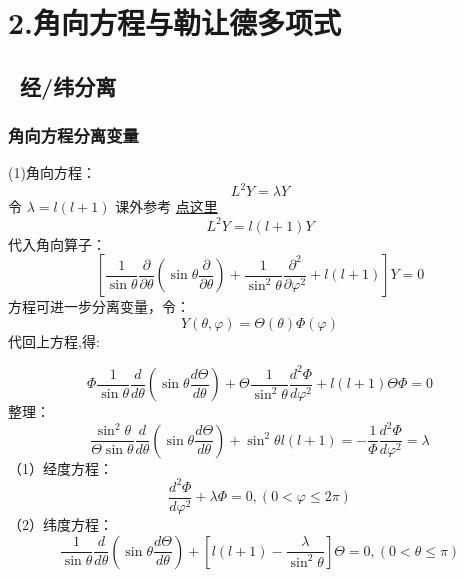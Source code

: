 \section{2.角向方程与勒让德多项式}

\subsection{ 经/纬分离}

\begin{frame}
	\frametitle{角向方程分离变量}
	(1)角向方程：
	\begin{equation*}
		L^2 Y=\lambda Y
	\end{equation*}	
	令 $\lambda=l(l+1) $ 课外参考 \href{https://zhuanlan.zhihu.com/p/133865994}{点这里}
	\begin{equation*}
		L^2 Y=l(l+1) Y
	\end{equation*}	
	代入角向算子：
	\begin{equation*}
		\left[ \frac{1}{ \sin \theta  } \frac{\partial }{\partial \theta } (\sin \theta \frac{\partial }{\partial \theta } )
		+\frac{1}{ \sin^2 \theta  } \frac{\partial^2}{\partial\varphi ^2}  +l(l+1) \right] Y=0 
	\end{equation*}	
	方程可进一步分离变量，令：
	\begin{equation*}
		Y(\theta,\varphi)= \Theta(\theta) \Phi(\varphi)
	\end{equation*}	
	代回上方程,得:
\end{frame}	

\begin{frame}
	\begin{equation*}
		\Phi \frac{1}{\sin \theta} \frac{d}{d \theta}\left(\sin \theta \frac{d \Theta}{d \theta}\right)+\Theta \frac{1}{\sin ^{2} \theta} \frac{d^{2} \Phi}{d \varphi^{2}}+l(l+1) \Theta \Phi=0
	\end{equation*}	
	整理：
	\begin{equation*}
		\frac{\sin ^{2} \theta}{\Theta \sin \theta} \frac{d}{d \theta}\left(\sin \theta \frac{d \Theta}{d \theta}\right)+\sin ^{2} \theta l(l+1)=-\frac{1}{\Phi} \frac{d^{2} \Phi}{d \varphi^{2}}=\lambda
	\end{equation*}	
	（1）经度方程：
	\begin{equation*}
		\frac{d^{2} \Phi}{d \varphi^{2}}+\lambda \Phi=0,(0<\varphi\le2 \pi)
	\end{equation*}	
	（2）纬度方程：
	\begin{equation*}
		\frac{1}{\sin \theta} \frac{d}{d \theta}\left(\sin \theta \frac{d \Theta}{d \theta}\right)+\left[l(l+1)-\frac{\lambda}{\sin ^{2} \theta}\right] \Theta=0,(0<\theta \le \pi)
	\end{equation*}	
\end{frame}	

